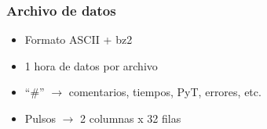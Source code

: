 \documentclass{beamer}
\begin{document}
\begin{frame}
				\frametitle{Archivo de datos}
				\begin{itemize}
								\item Formato ASCII + bz2
								\item 1 hora de datos por archivo
								\item ``\#'' $\to$ comentarios, tiempos, PyT, errores, etc.
								\item Pulsos $\to$ 2 columnas x 32 filas
				\end{itemize}
\end{frame}
\end{document}
